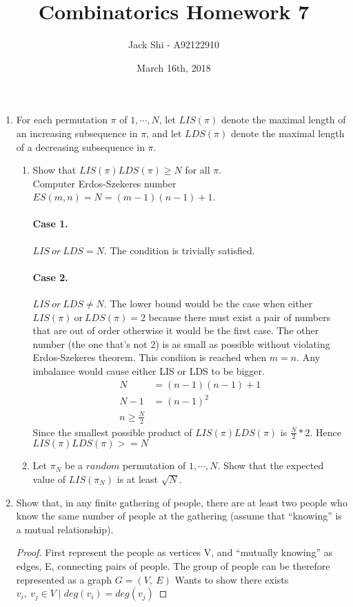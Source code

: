 \documentclass{article}
\title{Combinatorics Homework 7}
\author{Jack Shi - A92122910}
\date{March 16th, 2018}
\begin{document}
\maketitle

\begin{enumerate} [label=(\arabic*)]
	\item For each permutation $\pi$ of $1,\cdots,N$, let $LIS(\pi)$ denote the
		maximal length of an increasing subsequence in $\pi$, and let $LDS(\pi)$
		denote the maximal length of a decreasing subsequence in $\pi$.
		\begin{enumerate} [label=(\alph*)]
			\item Show that $LIS(\pi)LDS(\pi) \ge N$ for all $\pi$.\\
			Computer Erdos-Szekeres number $ES(m, n) = N = (m-1)(n-1)+1$.
			\paragraph{Case 1.}$LIS\ or\ LDS = N$. The condition is trivially
			satisfied.
			\paragraph{Case 2.}$LIS\ or\ LDS \neq N$. The lower bound would be the
			case when either $LIS(\pi)\ \text{or}\ LDS(\pi) = 2$ because there must
			exist a pair of numbers that are out of order otherwise it would be the
			first case. The other number (the one that's not 2) is as small as
			possible without violating Erdos-Szekeres theorem. This condiion is
			reached when $m=n$. Any imbalance would cause either LIS or LDS to be
			bigger.
			\begin{align*}
				N &= (n-1)(n-1) + 1\\
				N-1 &= (n-1)^2\\
				n \ge \frac{N}{2}
			\end{align*}
			Since the smallest possible product of $LIS(\pi)LDS(\pi)$ is
			$\frac{N}{2}*2$. Hence $LIS(\pi)LDS(\pi) >= N$

			\item Let $\pi_N$ be a $random$ permutation of $1,\cdots,N$. Show that the
				expected value of $LIS(\pi_N)$ is at least $\sqrt{N}$.\\
		\end{enumerate}

	\item Show that, in any finite gathering of people, there are at least two
		people who know the same number of people at the gathering (assume that
		“knowing” is a mutual relationship).
		\begin{proof}
			First represent the people as vertices V, and ``mutually knowing'' as
			edges, E, connecting pairs of people. The group of people can be therefore
			represented as a graph $G = (V,\ E)$ Wants to show there exists $v_i,\ v_j
			\in V \mid deg(v_i) = deg(v_j)$

\end{proof}
\end{enumerate}
\end{document}
